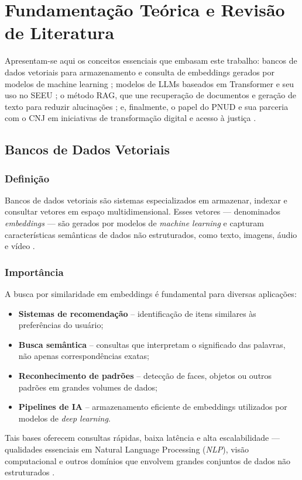 \chapter{Fundamentação Teórica e Revisão de Literatura}
\label{chap:fundamentacao_literatura}

Apresentam-se aqui os conceitos essenciais que embasam este trabalho: bancos de dados vetoriais para armazenamento e consulta de embeddings gerados por modelos de machine learning \cite{qwak2024integrating}; modelos de LLMs baseados em Transformer e seu uso no SEEU \cite{lewis2020rag,gao2023survey}; o método RAG, que une recuperação de documentos e geração de texto para reduzir alucinações \cite{edwards2024hybrid}; e, finalmente, o papel do PNUD e sua parceria com o CNJ em iniciativas de transformação digital e acesso à justiça \cite{undp2025sobre,undp2025pnudcnj}.

\section{Bancos de Dados Vetoriais}
\label{sec:bancos-vetoriais}

\subsection{Definição}
Bancos de dados vetoriais são sistemas especializados em armazenar, indexar e
consultar vetores em espaço multidimensional. Esses vetores — denominados
\emph{embeddings} — são gerados por modelos de \emph{machine learning} e
capturam características semânticas de dados não estruturados, como texto,
imagens, áudio e vídeo \cite{qwak2024integrating}.

\subsection{Importância}
A busca por similaridade em embeddings é fundamental para diversas
aplicações:
\begin{itemize}
  \item \textbf{Sistemas de recomendação} – identificação de itens similares às preferências do usuário;
  \item \textbf{Busca semântica} – consultas que interpretam o significado das palavras, não apenas correspondências exatas;
  \item \textbf{Reconhecimento de padrões} – detecção de faces, objetos ou outros padrões em grandes volumes de dados;
  \item \textbf{Pipelines de IA} – armazenamento eficiente de embeddings utilizados por modelos de \emph{deep learning}.
\end{itemize}
Tais bases oferecem consultas rápidas, baixa latência e alta escalabilidade —
qualidades essenciais em Natural Language Processing (\emph{NLP}), visão computacional e outros domínios que
envolvem grandes conjuntos de dados não estruturados
\cite{qwak2024integrating}.

